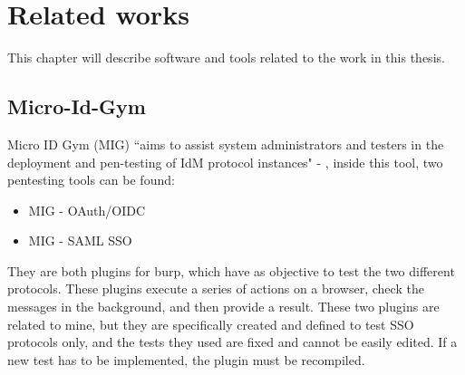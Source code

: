 \chapter{Related works}
\label{chap:Related_work}
This chapter will describe software and tools related to the work in this thesis.

\section{Micro-Id-Gym}
\label{sec:micro-id-gym}
Micro ID Gym (MIG) ``aims to assist system administrators and testers in the deployment and pen-testing of IdM protocol instances" - \cite{micro_id_gym}, inside this tool, two pentesting tools can be found:
\begin{itemize}
    \item MIG - OAuth/OIDC \cite{claudio_grisenti}
    \item MIG - SAML SSO \cite{stefano_facchini}
\end{itemize}
They are both plugins for \Gls{burp}, which have as objective to test the two different protocols. These plugins execute a series of actions on a browser, check the messages in the background, and then provide a result.
These two plugins are related to mine, but they are specifically created and defined to test SSO protocols only, and the tests they used are fixed and cannot be easily edited. If a new test has to be implemented, the plugin must be recompiled.


